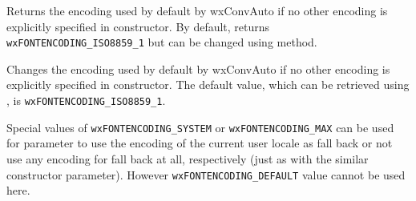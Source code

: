 Returns the encoding used by default by wxConvAuto if no other encoding is
explicitly specified in constructor. By default, returns 
\texttt{wxFONTENCODING\_ISO8859\_1} but can be changed using 
 method.


\label{wxconvautosetdefaultmbencoding}


Changes the encoding used by default by wxConvAuto if no other encoding is
explicitly specified in constructor. The default value, which can be retrieved
using , is 
\texttt{wxFONTENCODING\_ISO8859\_1}.

Special values of \texttt{wxFONTENCODING\_SYSTEM} or 
\texttt{wxFONTENCODING\_MAX} can be used for  parameter to use the
encoding of the current user locale as fall back or not use any encoding for
fall back at all, respectively (just as with the similar constructor
parameter). However \texttt{wxFONTENCODING\_DEFAULT} value cannot be used here.

